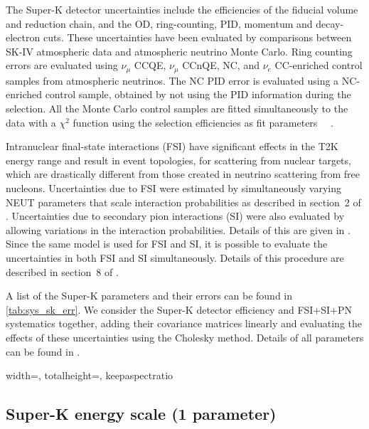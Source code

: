 The Super-K detector uncertainties include the efficiencies of the fiducial volume and reduction chain, and the OD, ring-counting, PID, momentum and decay-electron cuts. These uncertainties have been evaluated by comparisons between SK-IV atmospheric data and atmospheric neutrino Monte Carlo. Ring counting errors are evaluated using $\nu_\mu$ CCQE, $\nu_\mu$ CCnQE, NC, and $\nu_e$ CC-enriched control samples from atmospheric neutrinos.  The NC PID error is evaluated using a NC-enriched control sample, obtained by not using the PID information during the selection. All the Monte Carlo control samples are fitted simultaneously to the data with a $\chi^2$ function using the selection efficiencies as fit parameters ~\cite{SuperkErrors_numu}~\cite{SuperkErrors_nue}.

Intranuclear final-state interactions (FSI) have significant effects in the T2K energy range and result in event topologies, for scattering from nuclear targets, which are drastically different from those created in neutrino scattering from free nucleons.  Uncertainties due to FSI were estimated by simultaneously varying NEUT parameters that scale interaction probabilities as described in section\ 2 of \cite{NIWGErr}. Uncertainties due to secondary pion interactions (SI) were also evaluated by allowing variations in the interaction probabilities. Details of this are given in \cite{SI}.  Since the same model is used for FSI and SI, it is possible to evaluate the uncertainties in both FSI and SI simultaneously. Details of this procedure are described in section\ 8 of \cite{NEUTnuclear}.

A list of the Super-K parameters and their errors can be found in \cref{tab:sys_sk_err}. We consider the Super-K detector efficiency and FSI+SI+PN systematics together, adding their covariance matrices linearly and evaluating the effects of these uncertainties using the Cholesky method. Details of all parameters can be found in \cite{OurRun17cCC1piJointAnalysis3Flavour}.

\begin{table}
	\begin{adjustbox}{width=\textwidth, totalheight=\textheight, keepaspectratio}
		
	\end{adjustbox}
	\caption{Summary of SK detector + FSI + SI + PN systematics included in the VALOR joint fit analysis.}
	\label{tab:sys_sk_err}
\end{table}

\subsection{Super-K energy scale (1 parameter)}

